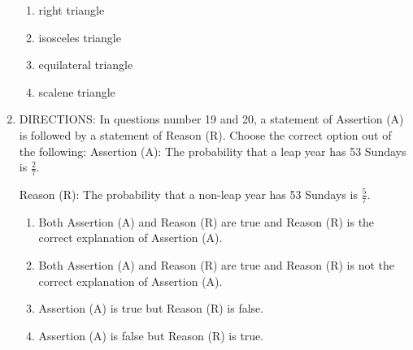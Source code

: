 \documentclass{article}
\begin{document}
\begin{enumerate}
\begin{enumerate}
    \item right triangle
    \item isosceles triangle
    \item equilateral triangle
    \item scalene triangle
\end{enumerate}
\newpage	
\item{DIRECTIONS:} In questions number 19 and 20, a statement of Assertion (A) is followed by a statement of Reason (R). Choose the correct option out of the following:
Assertion (A): The probability that a leap year has 53 Sundays is $\frac{2}{7}$.

Reason (R): The probability that a non-leap year has 53 Sundays is $\frac{5}{7}$.

\begin{enumerate}
    \item Both Assertion (A) and Reason (R) are true and Reason (R) is the correct explanation of Assertion (A).
    \item Both Assertion (A) and Reason (R) are true and Reason (R) is not the correct explanation of Assertion (A).
    \item Assertion (A) is true but Reason (R) is false.
    \item Assertion (A) is false but Reason (R) is true.
\end{enumerate}

\end{enumerate}
\end{document}
